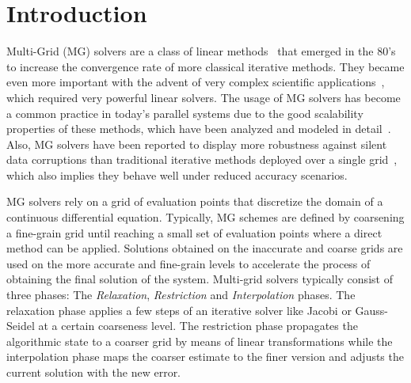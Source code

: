 \section{Introduction}
\label{sec:intro}

Multi-Grid (MG) solvers are a class of linear methods~\cite{Hackbusch1991} that
emerged in the 80's to increase the convergence rate of more classical
iterative methods.  They became even more important with the advent of very
complex scientific applications~\cite{Ashby1996}, which required very powerful
linear solvers.  The usage of MG solvers has become a common practice in
today's parallel systems due to the good scalability properties of these methods,
which have been analyzed and modeled in detail~\cite{Gahvari11}.
Also, MG solvers have been reported to display more robustness against silent
data corruptions than traditional iterative methods deployed over a single
grid~\cite{Casas12}, which also implies they behave well under reduced accuracy
scenarios.

MG solvers rely on a grid of evaluation points that discretize the
domain of a continuous differential equation.  Typically, MG schemes are
defined by coarsening a fine-grain grid until reaching a small set of
evaluation points where a direct method can be applied.
Solutions obtained on the inaccurate and coarse grids are used on the more
accurate and fine-grain levels to accelerate the process of obtaining the final
solution of the system.
Multi-grid solvers typically consist of three phases: The \textit{Relaxation},
\textit{Restriction} and \textit{Interpolation} phases.  The relaxation phase
applies a few steps of an iterative solver like Jacobi or Gauss-Seidel at a
certain coarseness level.  The restriction phase propagates the algorithmic
state to a coarser grid by means of linear transformations while the
interpolation phase maps the coarser estimate to the finer version and adjusts
the current solution with the new error.

